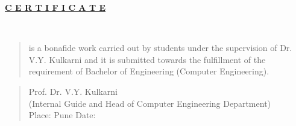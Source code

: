 \documentclass[oneside,a4paper,12pt]{report}
\begin{document}
\begin{figure}[ht]
\centering
\end{figure}


{\bfseries \fontsize{14}{12} \selectfont {}

\vspace*{2\baselineskip}} 


\begin{center}
	\textbf{\underline{C E R T I F I C A T E}}\\
	\vspace{0.2in}
\end{center}

\vspace*{.5\baselineskip} 


{\bfseries \fontsize{14}{12} \selectfont {}
\vspace*{0.5\baselineskip}}

{\bfseries \fontsize{14}{12} \selectfont \\ 
	\vspace*{1\baselineskip}} 
\vspace*{2\baselineskip}
\begin{quote}
is a bonafide work carried out by students under the supervision of Dr. V.Y. Kulkarni and it
is submitted towards the fulfillment of the requirement of Bachelor of Engineering (Computer Engineering).
\end{quote}
\noindent
\vspace{0.1 in}
\begin{quote}
	Prof. Dr. V.Y. Kulkarni\\
	(Internal Guide and Head of Computer Engineering Department)\\
	
	Place: Pune \hspace{2.2 in}  Date: 
\end{quote}

\newpage
\end{document}
